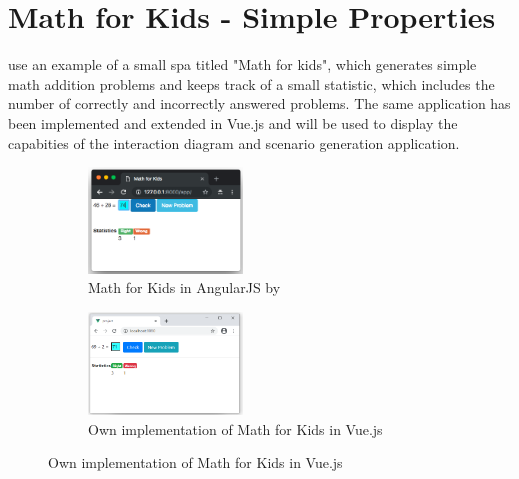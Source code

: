 \section{Math for Kids - Simple Properties}
\textcite{zhang2019scenario} use an example of a small \gls{spa} titled "Math for kids", which generates simple math addition problems and keeps track of a small statistic, which includes the number of correctly and incorrectly answered problems. The same application has been implemented and extended in Vue.js and will be used to display the capabities of the interaction diagram and scenario generation application.

\begin{figure}[H]
    \centering
    \begin{subfigure}[b]{0.45\textwidth}
         \centering
         \includegraphics[width=0.45\textwidth]{images/math_for_kids_zhang.png}
         \caption{Math for Kids in AngularJS by \textcite{zhang2019scenario}}
         \label{fig:evaluation_math_kids_zhang}
    \end{subfigure}\hfill%
    \begin{subfigure}[b]{0.45\textwidth}
        \centering
        \includegraphics[width=0.45\textwidth]{images/math_for_kids_own.png}
        \caption{Own implementation of Math for Kids in Vue.js}
        \label{fig:evaluation_math_kids_own}
    \end{subfigure}\hfill%
\end{figure}

